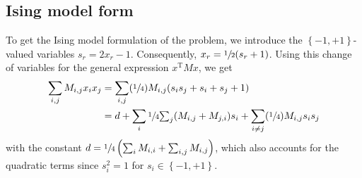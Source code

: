 \documentclass[11pt]{article}
\theoremstyle{definition}
\newcommand{\tr}{^{\mathrm{T}}}
\newcommand{\set}[1]{\left\{ #1 \right\}}
\newcommand{\smallsum}{{\textstyle{\sum}}}
\newcommand{\0}{\mathbf{0}}
\begin{document}
\subsection*{Ising model form}

To get the Ising model formulation of the problem, we introduce the $\set{-1,+1}$-valued variables
$s_r = 2 x_r - 1$.
Consequently, 
$x_r = \sfrac{1}{2}(s_r + 1)$.
Using this change of variables for the general expression $x\tr M x$, we get
\begin{align*}
\sum_{i,j} M_{i,j} x_i x_j
	&= \sum_{i,j} (\sfrac{1}{4}) M_{i,j}(s_i s_j + s_i + s_j + 1) \\
	&=  d 
		+ \sum_i \sfrac{1}{4} \smallsum_{j} ( M_{i,j} + M_{j,i} ) s_i
		+ \sum_{i \neq j} (\sfrac{1}{4}) M_{i,j} s_i s_j
\end{align*}
with the constant $d = \sfrac{1}{4}\left(\sum_i M_{i,i} +  \sum_{i, j} M_{i,j} \right)$, which also accounts for the quadratic terms since $s_i^2 = 1$ for $s_i \in \set{-1,+1}$.
\end{document}
